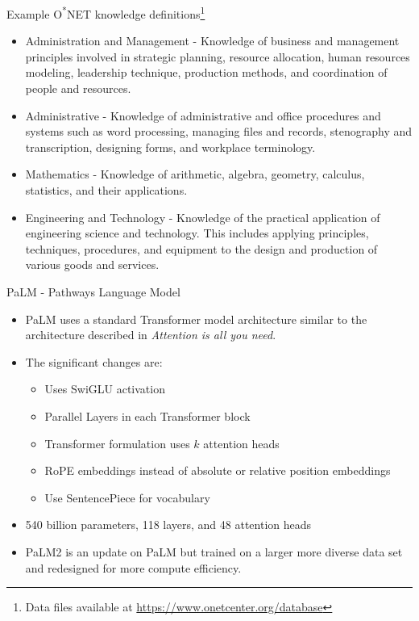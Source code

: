 \documentclass{beamer}
\begin{document}
\begin{frame}{Example O\textsuperscript{*}NET knowledge definitions\footnote{Data files available at \href{https://www.onetcenter.org/database.html\#individual-files}{https://www.onetcenter.org/database}}}
  \small
  \begin{itemize}
    \item Administration and Management - Knowledge of business and management principles involved in strategic planning, resource allocation, human resources modeling, leadership technique, production methods, and coordination of people and resources.
    \item Administrative - Knowledge of administrative and office procedures and systems such as word processing, managing files and records, stenography and transcription, designing forms, and workplace terminology.
    \item Mathematics - Knowledge of arithmetic, algebra, geometry, calculus, statistics, and their applications.
    \item Engineering and Technology - Knowledge of the practical application of engineering science and technology. This includes applying principles, techniques, procedures, and equipment to the design and production of various goods and services.
  \end{itemize}  
\end{frame}

\begin{frame}{PaLM - Pathways Language Model\cite{palm}}
  \begin{itemize}
  \item PaLM uses a standard Transformer model architecture similar to the architecture described in \textit{Attention is all you need}. 

  \item The significant changes are:

  \begin{itemize}
    \item Uses SwiGLU activation
    \item Parallel Layers in each Transformer block
    \item Transformer formulation uses $k$ attention heads
    \item RoPE embeddings instead of absolute or relative position embeddings 
    \item Use SentencePiece for vocabulary
  \end{itemize}

  \item 540 billion parameters, 118 layers, and 48 attention heads

  \item PaLM2 is an update on PaLM but trained on a larger more diverse data set and redesigned for more compute efficiency.\cite{palm2}

  \end{itemize}
\end{frame}
\end{document}
